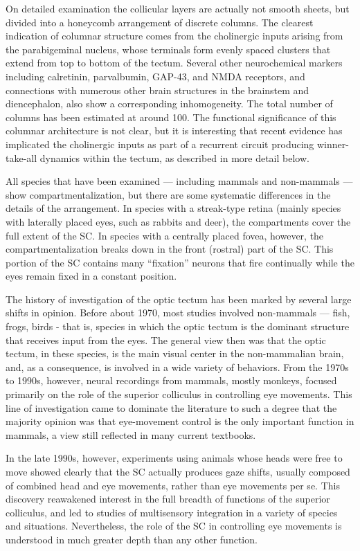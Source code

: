 On detailed examination the collicular layers are actually not smooth sheets, but divided into a honeycomb arrangement of discrete columns. The clearest indication of columnar structure comes from the cholinergic inputs arising from the parabigeminal nucleus, whose terminals form evenly spaced clusters that extend from top to bottom of the tectum. Several other neurochemical markers including calretinin, parvalbumin, GAP-43, and NMDA receptors, and connections with numerous other brain structures in the brainstem and diencephalon, also show a corresponding inhomogeneity. The total number of columns has been estimated at around 100. The functional significance of this columnar architecture is not clear, but it is interesting that recent evidence has implicated the cholinergic inputs as part of a recurrent circuit producing winner-take-all dynamics within the tectum, as described in more detail below.

All species that have been examined --- including mammals and non-mammals --- show compartmentalization, but there are some systematic differences in the details of the arrangement. In species with a streak-type retina (mainly species with laterally placed eyes, such as rabbits and deer), the compartments cover the full extent of the SC. In species with a centrally placed fovea, however, the compartmentalization breaks down in the front (rostral) part of the SC. This portion of the SC contains many ``fixation'' neurons that fire continually while the eyes remain fixed in a constant position.

The history of investigation of the optic tectum has been marked by several large shifts in opinion. Before about 1970, most studies involved non-mammals --- fish, frogs, birds - that is, species in which the optic tectum is the dominant structure that receives input from the eyes. The general view then was that the optic tectum, in these species, is the main visual center in the non-mammalian brain, and, as a consequence, is involved in a wide variety of behaviors. From the 1970s to 1990s, however, neural recordings from mammals, mostly monkeys, focused primarily on the role of the superior colliculus in controlling eye movements. This line of investigation came to dominate the literature to such a degree that the majority opinion was that eye-movement control is the only important function in mammals, a view still reflected in many current textbooks.

In the late 1990s, however, experiments using animals whose heads were free to move showed clearly that the SC actually produces gaze shifts, usually composed of combined head and eye movements, rather than eye movements per se. This discovery reawakened interest in the full breadth of functions of the superior colliculus, and led to studies of multisensory integration in a variety of species and situations. Nevertheless, the role of the SC in controlling eye movements is understood in much greater depth than any other function.

